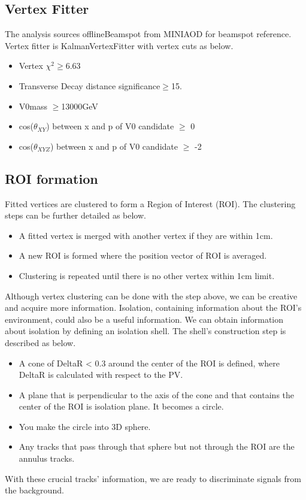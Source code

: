 \subsection{Vertex Fitter}\label{sec:ROI_V0Fitter}

The analysis sources offlineBeamspot from MINIAOD for beamspot reference.
Vertex fitter is KalmanVertexFitter with vertex cuts as below.
\begin{itemize}
  \item Vertex $\chi^{2}\geq$6.63 
  \item Transverse Decay distance significance$\geq$15.
  \item V0mass $\geq$13000GeV
  \item cos($\theta_{XY}$) between x and p of V0 candidate $\geq$ 0
  \item cos($\theta_{XYZ}$) between x and p of V0 candidate $\geq$ -2
\end{itemize}

\subsection{ROI formation}\label{sec:ROI_ROIformation}
Fitted vertices are clustered to form a Region of Interest (ROI).
The clustering steps can be further detailed as below.
\begin{itemize}
  \item A fitted vertex is merged with another vertex if they are within 1cm. 
  \item A new ROI is formed where the position vector of ROI is averaged.
  \item Clustering is repeated until there is no other vertex within 1cm limit.
\end{itemize}

Although vertex clustering can be done with the step above, we can be creative and acquire more information.
Isolation, containing information about the ROI's environment, could also be a useful information.
We can obtain information about isolation by defining an isolation shell.
The shell's construction step is described as below.
\begin{itemize}
  \item A cone of DeltaR < 0.3 around the center of the ROI is defined, where DeltaR is calculated with respect to the PV. 
  \item	A plane that is perpendicular to the axis of the cone and that contains the center of the ROI is isolation plane. It becomes a circle. 
  \item You make the circle into 3D sphere.
  \item Any tracks that pass through that sphere but not through the ROI are the annulus tracks.
\end{itemize}
With these crucial tracks' information, we are ready to discriminate signals from the background.


